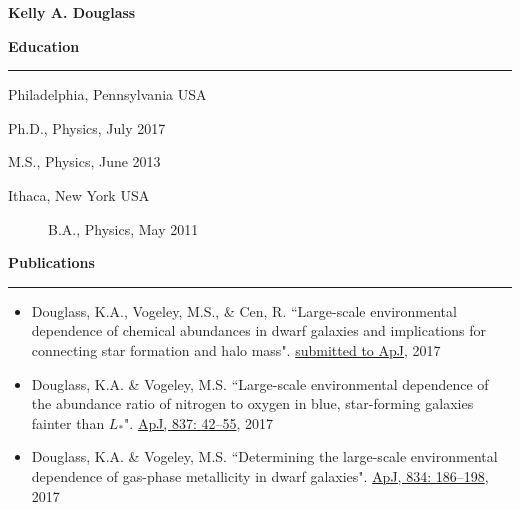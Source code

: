 \newcommand{\sectionrule}{\noindent \hfil\rule{\textwidth}{.6pt}\hfil}

\iffinal{}{\newpage}

\begin{vita}

{\Large\bf Kelly A. Douglass}

\singlespacing


\noindent
{\large\bf {\sc Education}}

\sectionrule
\vspace{1mm}

\begin{description}[noitemsep]
    \item[Drexel University] Philadelphia, Pennsylvania USA
    \begin{description}[noitemsep]
	    \item[] Ph.D., Physics, July 2017
	    \item[] M.S., Physics, June 2013
    \end{description}
    \item[Cornell University] Ithaca, New York USA
    \begin{description}
	    \item[] B.A., Physics, May 2011
    \end{description}
\end{description}



\noindent
{\large\bf {\sc Publications}}

\sectionrule

\begin{itemize} %
    \item Douglass, K.A., Vogeley, M.S., \& Cen, R.  ``Large-scale environmental dependence of chemical abundances in dwarf galaxies and implications for connecting star formation and halo mass". \href{https://doi.org/}{submitted to ApJ}, 2017
	\item Douglass, K.A. \& Vogeley, M.S.  ``Large-scale environmental dependence of the abundance ratio of nitrogen to oxygen in blue, star-forming galaxies fainter than $L_*$". \href{https://doi.org/10.3847/1538-4357/aa5e53}{ApJ, 837: 42--55}, 2017
	\item Douglass, K.A. \& Vogeley, M.S.  ``Determining the large-scale environmental dependence of gas-phase metallicity in dwarf galaxies". \href{https://doi.org/10.3847/1538-4357/834/2/186}{ApJ, 834: 186--198}, 2017
\end{itemize}




\end{vita}
